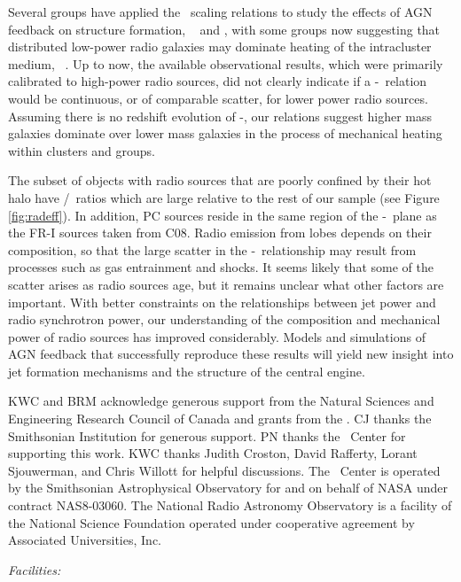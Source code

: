 \documentclass[12pt, preprint]{aastex}
\begin{document}
Several groups have applied the \birzan\ scaling relations to study
the effects of AGN feedback on structure formation,
\eg\ \citet{best07} and \citet{2007MNRAS.379..260M}, with some groups
now suggesting that distributed low-power radio galaxies may dominate
heating of the intracluster medium,
\eg\ \citet{2009ApJ...705..854H}. Up to now, the available
observational results, which were primarily calibrated to high-power
radio sources, did not clearly indicate if a \pjet-\prad\ relation
would be continuous, or of comparable scatter, for lower power radio
sources. Assuming there is no redshift evolution of \pjet-\prad, our
relations suggest higher mass galaxies dominate over lower mass
galaxies in the process of mechanical heating within clusters and
groups.

The subset of objects with radio sources that are poorly confined by
their hot halo have \prad/\pjet\ ratios which are large relative to
the rest of our sample (see Figure \ref{fig:radeff}). In addition, PC
sources reside in the same region of the \pjet-\prad\ plane as the
FR-I sources taken from C08. Radio emission from lobes depends on
their composition, so that the large scatter in the
\pjet-\prad\ relationship may result from processes such as gas
entrainment and shocks. It seems likely that some of the scatter
arises as radio sources age, but it remains unclear what other factors
are important. With better constraints on the relationships between
jet power and radio synchrotron power, our understanding of the
composition and mechanical power of radio sources has improved
considerably. Models and simulations of AGN feedback that successfully
reproduce these results will yield new insight into jet formation
mechanisms and the structure of the central engine.

\acknowledgements

KWC and BRM acknowledge generous support from the Natural Sciences and
Engineering Research Council of Canada and grants from the \cxo. CJ
thanks the Smithsonian Institution for generous support. PN thanks the
\cxo\ Center for supporting this work. KWC thanks Judith Croston,
David Rafferty, Lorant Sjouwerman, and Chris Willott for helpful
discussions. The \cxo\ Center is operated by the Smithsonian
Astrophysical Observatory for and on behalf of NASA under contract
NAS8-03060. The National Radio Astronomy Observatory is a facility of
the National Science Foundation operated under cooperative agreement
by Associated Universities, Inc.


{\it Facilities:}  





\clearpage

\clearpage


\end{document}
